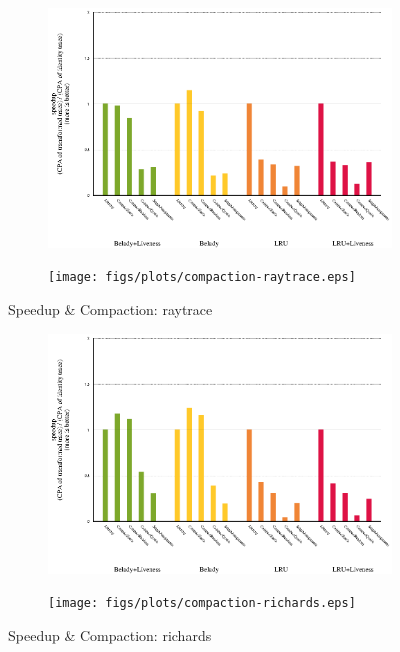 \begin{figure}[!ht]
  \begin{subfigure}[b]{0.5\textwidth}%
    \includegraphics[width=\textwidth]{figs/plots/speedup-raytrace.eps}
  \end{subfigure}%
  \begin{subfigure}[b]{0.5\textwidth}%
    \texttt{[image: figs/plots/compaction-raytrace.eps]}
  \end{subfigure}%
    \caption{Speedup \& Compaction: raytrace}
  \label{fig:speedup-compaction-raytrace}
\end{figure}

\begin{figure}[!ht]
  \begin{subfigure}[b]{0.5\textwidth}%
    \includegraphics[width=\textwidth]{figs/plots/speedup-richards.eps}
  \end{subfigure}%
  \begin{subfigure}[b]{0.5\textwidth}%
    \texttt{[image: figs/plots/compaction-richards.eps]}
  \end{subfigure}%
  \caption{Speedup \& Compaction: richards}
  \label{fig:speedup-compaction-richards}
\end{figure}
